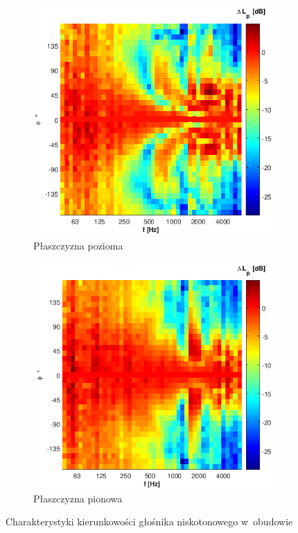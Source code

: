 \documentclass[12pt]{oska}
\begin{document}
	\begin{figure}[!ht]
		\centering
		\begin{subfigure}[b]{.7\textwidth}
			\includegraphics[width=\textwidth]{poziom_L.png}
			\caption{Płaszczyzna pozioma}
			\label{r:L_poziom}
		\end{subfigure}
		
		\begin{subfigure}[b]{.7\textwidth}
			\includegraphics[width=\textwidth]{pion_L_2.png}
			\caption{Płaszczyzna pionowa}
			\label{r:L_pion}
		\end{subfigure}
		\caption{Charakterystyki kierunkowości głośnika niskotonowego w~obudowie}
		\label{r:kierunkowosc_L}
	\end{figure}
	
\end{document}
